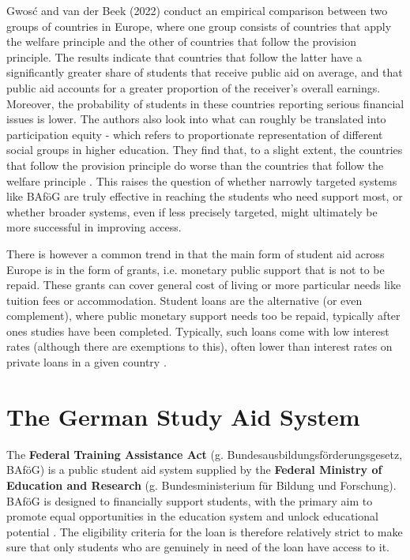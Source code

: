 Gwosć and van der Beek (2022) conduct an empirical comparison between two groups of countries in Europe, where one group consists of countries that apply the welfare principle and the other of countries that follow the provision principle. The results indicate that countries that follow the latter have a significantly greater share of students that receive public aid on average, and that public aid accounts for a greater proportion of the receiver’s overall earnings. Moreover, the probability of students in these countries reporting serious financial issues is lower. The authors also look into what can roughly be translated into participation equity - which refers to proportionate representation of different social groups in higher education. They find that, to a slight extent, the countries that follow the provision principle do worse than the countries that follow the welfare principle \citep{gwosc_krisenbewaltigung_2022}. This raises the question of whether narrowly targeted systems like BAföG are truly effective in reaching the students who need support most, or whether broader systems, even if less precisely targeted, might ultimately be more successful in improving access.

There is however a common trend in that the main form of student aid across Europe is in the form of grants, i.e. monetary public support that is not to be repaid. These grants can cover general cost of living or more particular needs like tuition fees or accommodation. Student loans are the alternative (or even complement), where public monetary support needs too be repaid, typically after ones studies have been completed. Typically, such loans come with low interest rates (although there are exemptions to this), often lower than interest rates on private loans in a given country \citep{schwarz_study_2004}.

\section{The German Study Aid System} 
\label{section:the-german-study-aid-system}

The \textbf{Federal Training Assistance Act} (g. Bundesausbildungsförderungsgesetz, BAföG) is a public student aid system supplied by the \textbf{Federal Ministry of Education and Research} (g. Bundesministerium für Bildung und Forschung). BAföG is designed to financially support students, with the primary aim to promote equal opportunities in the education system and unlock educational potential \citep{meier_bafog_2024}. The eligibility criteria for the loan is therefore relatively strict to make sure that only students who are genuinely in need of the loan have access to it.

